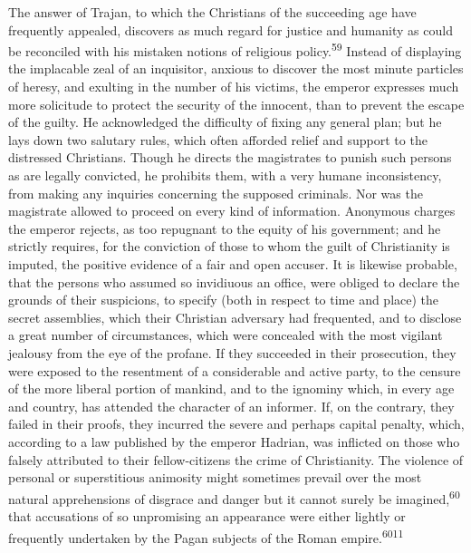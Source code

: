 The answer of Trajan, to which the Christians of the succeeding
age have frequently appealed, discovers as much regard for
justice and humanity as could be reconciled with his mistaken
notions of religious policy.\textsuperscript{59} Instead of displaying the
implacable zeal of an inquisitor, anxious to discover the most
minute particles of heresy, and exulting in the number of his
victims, the emperor expresses much more solicitude to protect
the security of the innocent, than to prevent the escape of the
guilty. He acknowledged the difficulty of fixing any general
plan; but he lays down two salutary rules, which often afforded
relief and support to the distressed Christians. Though he
directs the magistrates to punish such persons as are legally
convicted, he prohibits them, with a very humane inconsistency,
from making any inquiries concerning the supposed criminals. Nor
was the magistrate allowed to proceed on every kind of
information. Anonymous charges the emperor rejects, as too
repugnant to the equity of his government; and he strictly
requires, for the conviction of those to whom the guilt of
Christianity is imputed, the positive evidence of a fair and open
accuser. It is likewise probable, that the persons who assumed so
invidiuous an office, were obliged to declare the grounds of
their suspicions, to specify (both in respect to time and place)
the secret assemblies, which their Christian adversary had
frequented, and to disclose a great number of circumstances,
which were concealed with the most vigilant jealousy from the eye
of the profane. If they succeeded in their prosecution, they were
exposed to the resentment of a considerable and active party, to
the censure of the more liberal portion of mankind, and to the
ignominy which, in every age and country, has attended the
character of an informer. If, on the contrary, they failed in
their proofs, they incurred the severe and perhaps capital
penalty, which, according to a law published by the emperor
Hadrian, was inflicted on those who falsely attributed to their
fellow-citizens the crime of Christianity. The violence of
personal or superstitious animosity might sometimes prevail over
the most natural apprehensions of disgrace and danger but it
cannot surely be imagined,\textsuperscript{60} that accusations of so unpromising
an appearance were either lightly or frequently undertaken by the
Pagan subjects of the Roman empire.\textsuperscript{6011}


